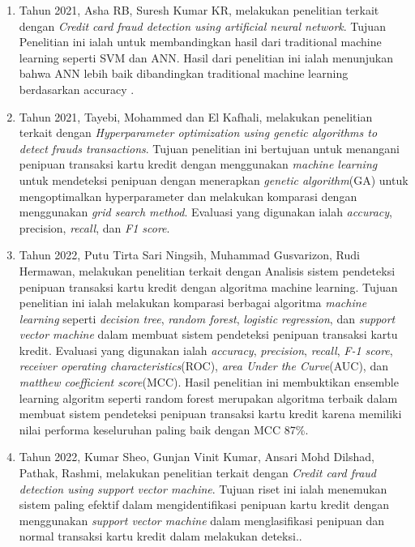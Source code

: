 \begin{enumerate}[noitemsep]
	\item Tahun 2021, Asha RB, Suresh Kumar KR,       melakukan penelitian terkait dengan \textit{Credit card fraud detection using artificial neural network}. Tujuan Penelitian ini ialah untuk membandingkan hasil dari traditional machine learning seperti SVM dan ANN. Hasil dari penelitian ini ialah menunjukan bahwa ANN lebih baik dibandingkan traditional machine learning berdasarkan accuracy \cite{asha2021credit}.
    \item Tahun 2021, Tayebi, Mohammed dan El Kafhali, melakukan penelitian terkait dengan \textit{Hyperparameter optimization using genetic algorithms to detect frauds transactions}. Tujuan penelitian ini bertujuan untuk menangani penipuan transaksi kartu kredit dengan menggunakan \textit{machine learning} untuk mendeteksi penipuan dengan menerapkan \textit{genetic algorithm}(GA) untuk mengoptimalkan hyperparameter dan melakukan komparasi dengan menggunakan \textit{grid search method}. Evaluasi yang digunakan ialah \textit{accuracy}, precision, \textit{recall}, dan \textit{F1 score}\cite{tayebi2021hyperparameter}.
    \item Tahun 2022, Putu Tirta Sari Ningsih, Muhammad Gusvarizon, Rudi Hermawan, melakukan penelitian terkait dengan Analisis sistem pendeteksi penipuan transaksi kartu kredit dengan algoritma machine learning. Tujuan penelitian ini ialah melakukan komparasi berbagai algoritma \textit{machine learning} seperti \textit{decision tree}, \textit{random forest}, \textit{logistic regression}, dan \textit{support vector machine} dalam membuat sistem pendeteksi penipuan transaksi kartu kredit. Evaluasi yang digunakan ialah \textit{accuracy}, \textit{precision}, \textit{recall}, \textit{F-1 score}, \textit{receiver operating characteristics}(ROC), \textit{area Under the Curve}(AUC), dan \textit{matthew coefficient score}(MCC). Hasil penelitian ini membuktikan ensemble learning algoritm seperti random forest merupakan algoritma terbaik dalam membuat sistem pendeteksi penipuan transaksi kartu kredit karena memiliki nilai performa keseluruhan paling baik dengan MCC 87\%\cite{ningsih2022analisis}.
    \item Tahun 2022, Kumar Sheo, Gunjan Vinit Kumar, Ansari Mohd Dilshad, Pathak, Rashmi, melakukan penelitian terkait dengan \textit{Credit card fraud detection using support vector machine}. Tujuan riset ini ialah menemukan sistem paling efektif dalam mengidentifikasi penipuan kartu kredit dengan menggunakan \textit{support vector machine} dalam  menglasifikasi penipuan dan normal transaksi kartu kredit dalam melakukan deteksi.\cite{kumar2022credit}.

\end{enumerate}
